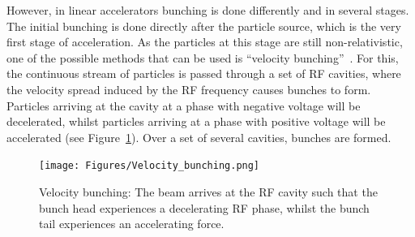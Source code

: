 However, in linear accelerators bunching is done differently and in several stages.
The initial bunching is done directly after the particle source, which is the very first stage of acceleration.
As the particles at this stage are still non-relativistic, one of the possible methods that can be used is ``velocity bunching''~\cite[cf. p. 541ff]{Wiedemann}.
For this, the continuous stream of particles is passed through a set of RF cavities, where the velocity spread induced by the RF frequency causes bunches to form.
Particles arriving at the cavity at a phase with negative voltage will be decelerated, whilst particles arriving at a phase with positive voltage will be accelerated (see Figure~\ref{fig:Velocity_bunching}).
Over a set of several cavities, bunches are formed.
\begin{figure}
\centering
\texttt{[image: Figures/Velocity\_bunching.png]}
\caption[Illustration explaining ``velocity bunching'']{Velocity bunching: The beam arrives at the RF cavity such that the bunch head experiences a decelerating RF phase, whilst the bunch tail experiences an accelerating force.}
\label{fig:Velocity_bunching}
\end{figure}

